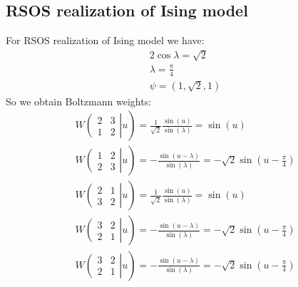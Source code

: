 \documentclass[12pt]{article}
\begin{document}
\subsection{RSOS realization of Ising model}
\label{sec:rsos-real-ising}

For RSOS realization of Ising model we have:
\begin{eqnarray}
  \label{eq:10}
  2 \cos\lambda = \sqrt{2}\\
  \lambda=\frac{\pi}{4}\\
  \psi = (1,\sqrt{2},1)
\end{eqnarray}
So we obtain Boltzmann weights:
\begin{equation}
  \label{eq:9}
  \begin{array}{l}
  W\left.\left(
    \begin{array}{ll}
      2 & 3\\
      1 & 2
    \end{array}\right| u \right) = \frac{1}{\sqrt{2}} \frac{\sin(u)}{\sin(\lambda)}=\sin(u)\\
  W\left.\left(
    \begin{array}{ll}
      1 & 2\\
      2 & 3
    \end{array}\right| u
\right)=-\frac{\sin(u-\lambda)}{\sin(\lambda)}=-\sqrt{2}\sin\left(u-\frac{\pi}{4}\right)\\
  W\left.\left(
    \begin{array}{ll}
      2 & 1\\
      3 & 2
    \end{array}\right| u
\right)=\frac{1}{\sqrt{2}}\frac{\sin(u)}{\sin(\lambda)}=\sin(u)\\
  W\left.\left(
    \begin{array}{ll}
      3 & 2\\
      2 & 1
    \end{array}\right| u
\right)=-\frac{\sin(u-\lambda)}{\sin(\lambda)}=-\sqrt{2}\sin\left(u-\frac{\pi}{4}\right)\\
  W\left.\left(
    \begin{array}{ll}
      3 & 2\\
      2 & 1
    \end{array}\right| u
\right)=-\frac{\sin(u-\lambda)}{\sin(\lambda)}=-\sqrt{2}\sin\left(u-\frac{\pi}{4}\right)\\
\end{array}
\end{equation}
\end{document}
